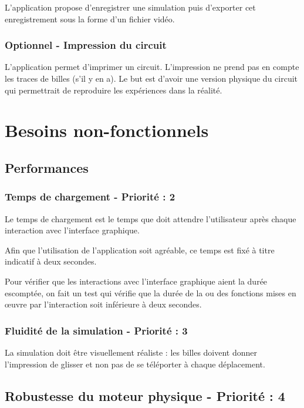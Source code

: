 \documentclass{report}
\begin{document}
L’application propose d’enregistrer une simulation puis d’exporter cet enregistrement sous la forme d’un fichier vidéo.

\subsubsection{Optionnel - Impression du circuit}

L’application permet d’imprimer un circuit. L’impression ne prend pas en compte les traces de billes (s’il y en a). Le but est d’avoir une version physique du circuit qui permettrait de reproduire les expériences dans la réalité.

\newpage

\section{Besoins non-fonctionnels}

\subsection{Performances}

\subsubsection{Temps de chargement - Priorité : 2}

Le temps de chargement est le temps que doit attendre l’utilisateur après chaque interaction avec l’interface graphique.

Afin que l’utilisation de l’application soit agréable, ce temps est fixé à titre indicatif à deux secondes.

Pour vérifier que les interactions avec l’interface graphique aient la durée escomptée, on fait un test qui vérifie que la durée de la ou des fonctions mises en œuvre par l’interaction soit inférieure à deux secondes.


\subsubsection{Fluidité de la simulation - Priorité : 3}

La simulation doit être visuellement réaliste : les billes doivent donner l’impression de glisser et non pas de se téléporter à chaque déplacement.

\subsection{Robustesse du moteur physique - Priorité : 4}
\end{document}
